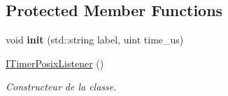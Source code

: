 \subsection*{Protected Member Functions}
\begin{DoxyCompactItemize}
\item 
\mbox{\label{classITimerPosixListener_a8fa649b55c2f2fe751ee0bedb3a28e31}} 
void {\bfseries init} (std\+::string label, uint time\+\_\+us)
\item 
\mbox{\label{classITimerPosixListener_ab72547ab3e43d15769a6c18799f07062}} 
\hyperlink{classITimerPosixListener_ab72547ab3e43d15769a6c18799f07062}{I\+Timer\+Posix\+Listener} ()
\begin{DoxyCompactList}\small\item\em Constructeur de la classe. \end{DoxyCompactList}\end{DoxyCompactItemize}
